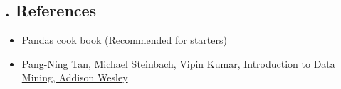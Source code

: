 \documentclass[11pt]{article}
\providecommand{\tightlist}{%
      \setlength{\itemsep}{0pt}\setlength{\parskip}{0pt}}
\begin{document}
    \hypertarget{references}{%
\subsection{. References}\label{references}}

    \begin{itemize}
\tightlist
\item
  Pandas cook book
  (\href{http://pandas.pydata.org/pandas-docs/stable/cookbook.html}{Recommended
  for starters})
\item
  \href{https://dl.acm.org/citation.cfm?id=1095618}{Pang-Ning Tan,
  Michael Steinbach, Vipin Kumar, Introduction to Data Mining, Addison
  Wesley}
\end{itemize}


    
    
    
    
\end{document}
